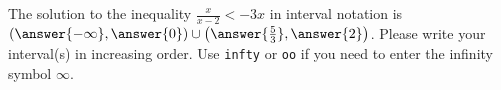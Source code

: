 \documentclass{ximera}
\begin{document}
\begin{exercise}
\begin{exercise}
\begin{exercise}
\begin{exercise}
\begin{exercise}
The solution to the inequality $\frac{x}{x - 2} < -3x$ in interval notation is $(\answer{- \infty}, \answer{0}) \cup \left(\answer{\frac{5}{3}}, \answer{2}\right)$. Please write your interval(s) in increasing order. Use \verb+infty+ or \verb+oo+ if you need to enter the infinity symbol $\infty$.
\end{exercise}

\end{exercise}
\end{exercise}
\end{exercise}

\end{exercise}
\end{document}
